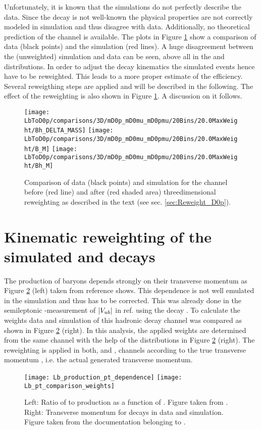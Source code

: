 Unfortunately, it is known that the simulations do not perfectly describe the data. 
Since the decay \LbToDpmunuX is not well-known the physical properties are not correctly modeled in simulation and thus disagree with data.
Additionally, no theoretical prediction of the \LbToDpmunuX channel is available.
The plots in Figure \ref{fig:reweighting} show a comparison of data (black points) and the simulation (red lines).
A huge disagreement between the (unweighted) simulation and data can be seen, above all in the \MDp and \MDmu distributions.
In order to adjust the decay kinematics the simulated events hence have to be reweighted.
This leads to a more proper estimate of the efficiency.
Several reweigthing steps are applied and will be described in the following.
The effect of the reweighting is also shown in Figure \ref{fig:reweighting}.
A discussion on it follows.
\begin{figure}[ptb]
	\centering
	\texttt{[image: LbToD0p/comparisons/3D/mD0p\_mD0mu\_mD0pmu/20Bins/20.0MaxWeight/Bh\_DELTA\_MASS]}
	\texttt{[image: LbToD0p/comparisons/3D/mD0p\_mD0mu\_mD0pmu/20Bins/20.0MaxWeight/B\_M]}
	\texttt{[image: LbToD0p/comparisons/3D/mD0p\_mD0mu\_mD0pmu/20Bins/20.0MaxWeight/Bh\_M]}
	\caption{Comparison of data (black points) and simulation for the \LbToDpmunuX channel before (red line) and after (red shaded area) threedimensional reweighting as described in the text (see sec. \ref{sec:Reweight_D0p}).}
	\label{fig:reweighting}
\end{figure}

\section{Kinematic reweighting of the simulated \LbToDpmunuX and \LbToLcmunu decays}
The production of \Lb baryons depends strongly on their transverse momentum as Figure \ref{fig:LbPTrew} (left) taken from reference \cite{Lb_production_kinematic} shows. 
This dependence is not well emulated in the simulation and thus has to be corrected. 
This was already done in the semileptonic \lhcb-measurement of $|{V_{{u}{b}}}|$ in ref. \cite{SL_Vub} using the decay \decay{\Lb}{\jpsi\Dz\proton}. 
To calculate the weights data and simulation of this hadronic \Lb decay channel was compared as shown in Figure \ref{fig:LbPTrew} (right). 
In this analysis, the applied weights are determined from the same channel with the help of the distributions in Figure \ref{fig:LbPTrew} (right).
The reweighting is applied in both, \LbToDpmunuX and \LbToLcmunu, channels according to the true \Lb transverse momentum \pt, i.e. the actual generated transverse momentum.
\begin{figure}[ptb]
	\centering
	\texttt{[image: Lb\_production\_pt\_dependence]}
	\texttt{[image: Lb\_pt\_comparison\_weights]}
	\caption{Left: Ratio of \Lb to \Bd production as a function of \pt. Figure taken from \cite{Lb_production_kinematic}.  Right: Transverse \Lb momentum for \decay{\Lb}{\jpsi\Dz\proton} decays in data and simulation. Figure taken from the documentation belonging to \cite{SL_Vub}.}
	\label{fig:LbPTrew}
\end{figure}

